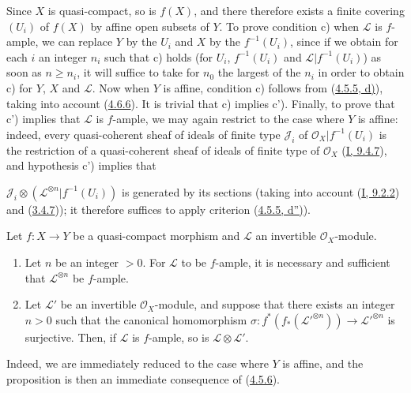 Since $X$ is quasi-compact, so is $f(X)$, and there therefore exists
a finite covering $(U_i)$ of $f(X)$ by affine open subsets of $Y$. To
prove condition c) when $\mathcal{L}$ is $f$-ample, we can
replace $Y$ by the $U_i$ and $X$ by the $f^{-1}(U_i)$, since if we obtain
for each $i$ an integer $n_i$ such that c) holds (for $U_i$,
$f^{-1}(U_i)$ and $\mathcal{L}|f^{-1}(U_i)$) as soon as $n\geq n_i$, it
will suffice to take for $n_0$ the largest of the $n_i$ in order to obtain c) for
$Y$, $X$ and $\mathcal{L}$. Now when $Y$ is affine, condition c)
follows from (\hyperref[II.4.5.5]{4.5.5, d)}), taking into account
(\hyperref[II.4.6.6]{4.6.6}). It is trivial that c) implies c'). Finally,
to prove that c') implies that $\mathcal{L}$ is $f$-ample, we may
again restrict to the case where $Y$ is affine: indeed, every quasi-coherent
sheaf of ideals of finite type $\mathcal{J}_i$ of
$\mathcal{O}_X|f^{-1}(U_i)$ is the restriction of a quasi-coherent sheaf
of ideals of finite type of $\mathcal{O}_X$
(\hyperref[I.9.4.7]{I, 9.4.7}), and hypothesis c') implies that


$\mathcal{J}_i\otimes(\mathcal{L}^{\otimes n}|f^{-1}(U_i))$ is generated
by its sections (taking into account (\hyperref[I.9.2.2]{I, 9.2.2}) and
(\hyperref[II.3.4.7]{3.4.7})); it therefore suffices to apply criterion
(\hyperref[II.4.5.5]{4.5.5, d'')}).

\begin{proposition}[4.6.9]
\label{II.4.6.9}
Let $f:X\to Y$ be a quasi-compact morphism and $\mathcal{L}$ an invertible
$\mathcal{O}_X$-module.
\begin{enumerate}
  \item[\rm{(i)}] Let $n$ be an integer $>0$. For $\mathcal{L}$ to be
  $f$-ample, it is necessary and sufficient that $\mathcal{L}^{\otimes n}$ be
  $f$-ample.
  \item[\rm{(ii)}] Let $\mathcal{L}'$ be an invertible $\mathcal{O}_X$-module,
  and suppose that there exists an integer $n>0$ such that
  the canonical homomorphism
  $\sigma:f^*(f_*(\mathcal{L}'^{\otimes n}))\to
  \mathcal{L}'^{\otimes n}$ is surjective. Then, if $\mathcal{L}$ is
  $f$-ample, so is $\mathcal{L}\otimes\mathcal{L}'$.
\end{enumerate}
\end{proposition}

Indeed, we are immediately reduced to the case where $Y$ is affine, and the proposition
is then an immediate consequence of (\hyperref[II.4.5.6]{4.5.6}).

